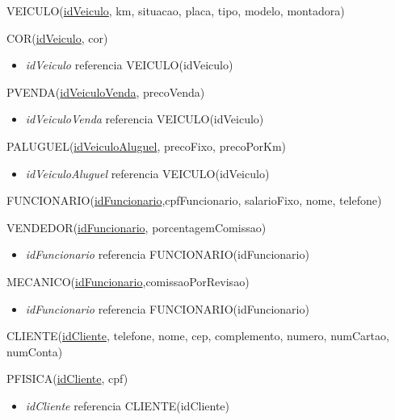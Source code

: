 \documentclass[brazil, a4paper,12pt]{article}
\begin{document}
VEICULO(\underline{idVeiculo}, km, situacao, placa, tipo, modelo, montadora)

\vspace{1cm}

COR(\underline{idVeiculo}, cor)
\begin{itemize}
\item \emph{idVeiculo} referencia VEICULO(idVeiculo)
\end{itemize}
\vspace{1cm}

PVENDA(\underline{idVeiculoVenda}, precoVenda)
\begin{itemize}
\item \emph{idVeiculoVenda} referencia VEICULO(idVeiculo)
\end{itemize}

\vspace{1cm}

PALUGUEL(\underline{idVeiculoAluguel}, precoFixo, precoPorKm)
\begin{itemize}
\item \emph{idVeiculoAluguel} referencia VEICULO(idVeiculo)
\end{itemize}

\vspace{1cm}

FUNCIONARIO(\underline{idFuncionario},cpfFuncionario, salarioFixo, nome, telefone)

\vspace{1cm}

VENDEDOR(\underline{idFuncionario}, porcentagemComissao)
\begin{itemize}
\item \emph{idFuncionario} referencia FUNCIONARIO(idFuncionario)
\end{itemize}

\vspace{1cm}

MECANICO(\underline{idFuncionario},comissaoPorRevisao)
\begin{itemize}
\item \emph{idFuncionario} referencia FUNCIONARIO(idFuncionario)
\end{itemize}

\vspace{1cm}

CLIENTE(\underline{idCliente}, telefone, nome, cep, complemento, numero, numCartao, numConta)

\vspace{1cm}

PFISICA(\underline{idCliente}, cpf)
\begin{itemize}
\item \emph{idCliente} referencia CLIENTE(idCliente)
\end{itemize}
\end{document}
